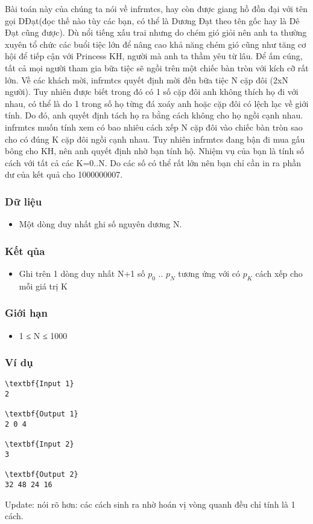

Bài toán này của chúng ta nói về infrmtcs, hay còn được giang hồ đồn đại với tên gọi DĐạt(đọc thế nào tùy các bạn, có thể là Dương Đạt theo tên gốc hay là Dê Đạt cũng được). Dù nổi tiếng xấu trai nhưng do chém gió giỏi nên anh ta thường xuyên tổ chức các buổi tiệc lớn để nâng cao khả năng chém gió cũng như tăng cơ hội để tiếp cận với Princess KH, người mà anh ta thầm yêu từ lâu. Để ấm cúng, tất cả mọi người tham gia bữa tiệc sẽ ngồi trên một chiếc bàn tròn với kích cỡ rất lớn. Về các khách mời, infrmtcs quyết định mời đến bữa tiệc N cặp đôi (2xN người). Tuy nhiên được biết trong đó có 1 số cặp đôi anh không thích họ đi với nhau, có thể là do 1 trong số họ từng đá xoáy anh hoặc cặp đôi có lệch lạc về giới tính. Do đó, anh quyết định tách họ ra bằng cách không cho họ ngồi cạnh nhau. infrmtcs muốn tính xem có bao nhiêu cách xếp N cặp đôi vào chiếc bàn tròn sao cho có đúng K cặp đôi ngồi cạnh nhau. Tuy nhiên infrmtcs đang bận đi mua gấu bông cho KH, nên anh quyết định nhờ bạn tính hộ. Nhiệm vụ của bạn là tính số cách với tất cả các K=0..N. Do các số có thể rất lớn nên bạn chỉ cần in ra phần dư của kết quả cho 1000000007.

\subsubsection{Dữ liệu}
\begin{itemize}
	\item Một dòng duy nhất ghi số nguyên dương N.
\end{itemize}

\subsubsection{Kết qủa}
\begin{itemize}
	\item Ghi trên 1 dòng duy nhất N+1 số $p_{0}$ .. $p_{N}$ tương ứng với có $p_{K}$ cách xếp cho mỗi giá trị K
\end{itemize}

\subsubsection{Giới hạn}
\begin{itemize}
	\item 1 ≤ N ≤ 1000
\end{itemize}

\subsubsection{Ví dụ}
\begin{verbatim}
\textbf{Input 1}
2

\textbf{Output 1}
2 0 4

\textbf{Input 2}
3

\textbf{Output 2}
32 48 24 16 \end{verbatim}




Update: nói rõ hơn: các cách sinh ra nhờ hoán vị vòng quanh đều chỉ tính là 1 cách.

